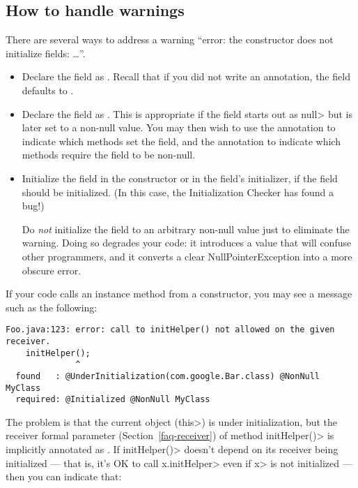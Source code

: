 \subsection{How to handle warnings\label{initialization-warnings}}

There are several ways to address a warning ``error:  the constructor does
not initialize fields: \ldots''.
\begin{itemize}
\item
  Declare the field as .  Recall
  that if you did not write an annotation, the field defaults to
  .
\item
  Declare the field as .
  This is appropriate if the field starts out as \<null> but is later set
  to a non-null value.  You may then wish to use the
   annotation to indicate
  which methods set the field, and the
   annotation to indicate
  which methods require the field to be non-null.
\item
  Initialize the field in the constructor or in the field's initializer, if
  the field should be initialized.  (In this case, the Initialization
  Checker has found a bug!)

  Do \emph{not} initialize the field to an arbitrary non-null value just to
  eliminate the warning.  Doing so degrades your code:  it introduces a
  value that will confuse other programmers, and it converts a clear
  NullPointerException into a more obscure error.
\end{itemize}

If your code calls an instance method from a constructor, you may see a
message such as the following:

\begin{Verbatim}
Foo.java:123: error: call to initHelper() not allowed on the given receiver.
    initHelper();
              ^
  found   : @UnderInitialization(com.google.Bar.class) @NonNull MyClass
  required: @Initialized @NonNull MyClass
\end{Verbatim}

The problem is that the current object (\<this>) is under initialization,
but the receiver formal parameter (Section~\ref{faq-receiver}) of method
\<initHelper()> is implicitly annotated as
.  If
\<initHelper()> doesn't depend on its receiver being initialized --- that
is, it's OK to call \<x.initHelper> even if \<x> is not initialized ---
then you can indicate that:

